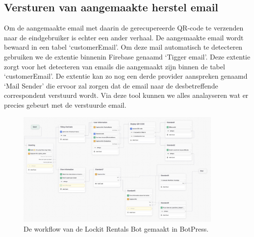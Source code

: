 \subsection{Versturen van aangemaakte herstel email}
\label{versturenQRcode}

Om de aangemaakte email met daarin de gerecupereerde QR-code te verzenden naar de eindgebruiker is echter een ander verhaal. De aangemaakte email wordt bewaard in een tabel ‘customerEmail’. Om deze mail automatisch te detecteren gebruiken we de extentie binnenin Firebase genaamd ‘Tigger email’. Deze extentie zorgt voor het detecteren van emails die aangemaakt zijn binnen de tabel ‘customerEmail’. De extentie kan zo nog een derde provider aanspreken genaamd ‘Mail Sender’ die ervoor zal zorgen dat de email naar de desbetreffende correspondent verstuurd wordt. Via deze tool kunnen we alles analayseren wat er precies  gebeurt met de verstuurde email. 

\begin{figure}[h]
    \centering
    \includegraphics[angle=90, width=0.9\textwidth]{graphics/F36_workflowBotPress.jpg}
    \captionsetup{justification=centering}    
    \caption{De workflow van de Lockit Rentals Bot gemaakt in BotPress.}
    \label{fig:workflowBotPress}
\end{figure}

